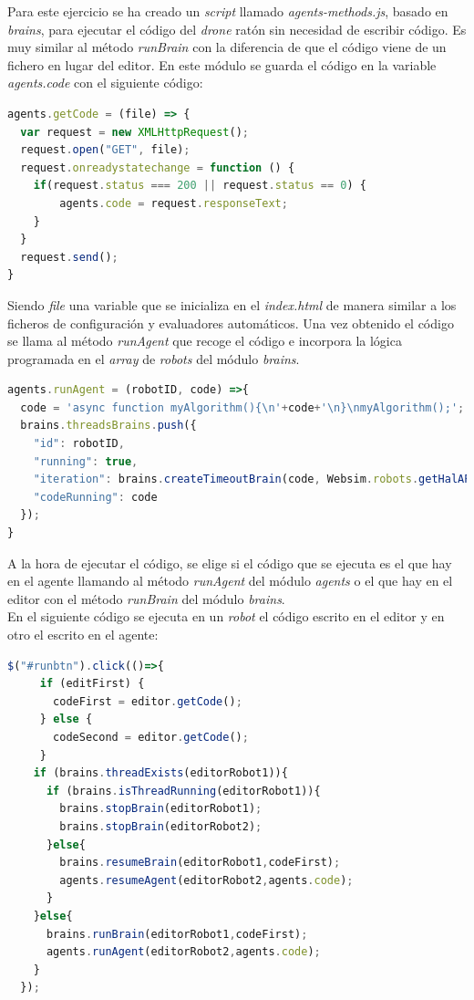 Para este ejercicio se ha creado un \textit{script} llamado \textit{agents-methods.js}, basado en \textit{brains}, para ejecutar el código del \textit{drone} ratón sin necesidad de escribir código. Es muy similar al método \textit{runBrain} con la diferencia de que el código viene de un fichero en lugar del editor. En este módulo se guarda el código en la variable \textit{agents.code} con el siguiente código: 

\begin{lstlisting}[language=javascript]
agents.getCode = (file) => {
  var request = new XMLHttpRequest();
  request.open("GET", file);
  request.onreadystatechange = function () {
    if(request.status === 200 || request.status == 0) {
        agents.code = request.responseText;
    }
  }
  request.send();
}
\end{lstlisting}

Siendo \textit{file} una variable que se inicializa en el \textit{index.html} de manera similar a los ficheros de configuración y evaluadores automáticos. 
Una vez obtenido el código se llama al método \textit{runAgent} que recoge el código e incorpora la lógica programada en el \textit{array} de \textit{robots} del módulo \textit{brains}.

\begin{lstlisting}[language=javascript]
agents.runAgent = (robotID, code) =>{
  code = 'async function myAlgorithm(){\n'+code+'\n}\nmyAlgorithm();';
  brains.threadsBrains.push({
    "id": robotID,
    "running": true,
    "iteration": brains.createTimeoutBrain(code, Websim.robots.getHalAPI(robotID), robotID),
    "codeRunning": code
  });
}
\end{lstlisting}

A la hora de ejecutar el código, se elige si el código que se ejecuta es el que hay en el agente llamando al método \textit{runAgent} del módulo \textit{agents} o el que hay en el editor con el método \textit{runBrain} del módulo \textit{brains}. \\
En el siguiente código se ejecuta en un \textit{robot} el código escrito en el editor y en otro el escrito en el agente:

\begin{lstlisting}[language=javascript]
  $("#runbtn").click(()=>{
     if (editFirst) {
       codeFirst = editor.getCode();
     } else {
       codeSecond = editor.getCode();
     }
    if (brains.threadExists(editorRobot1)){
      if (brains.isThreadRunning(editorRobot1)){
        brains.stopBrain(editorRobot1);
        brains.stopBrain(editorRobot2);
      }else{
        brains.resumeBrain(editorRobot1,codeFirst);
        agents.resumeAgent(editorRobot2,agents.code);
      }
    }else{
      brains.runBrain(editorRobot1,codeFirst);
      agents.runAgent(editorRobot2,agents.code);
    }
  });\end{lstlisting}
  
